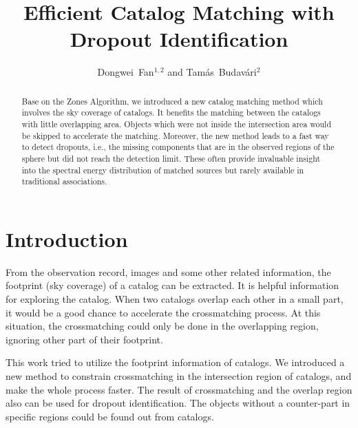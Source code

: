 
\resetcounters



\title{Efficient Catalog Matching with Dropout Identification}
\author{Dongwei~Fan$^{1,2}$ and Tam\'as~Budav\'ari$^2$}


\begin{abstract}
Base on the Zones Algorithm, we introduced a new catalog matching method which involves the sky coverage of catalogs. It benefits the matching between the catalogs with little overlapping area. Objects which were not inside the intersection area would be skipped to accelerate the matching. Moreover, the new method leads to a fast way to detect dropouts, i.e., the missing components that are in the observed regions of the sphere but did not reach the detection limit. These often provide invaluable insight into the spectral energy distribution of matched sources but rarely available in traditional associations.
\end{abstract}

\section{Introduction}
From the observation record, images and some other related information, the footprint (sky coverage) of a catalog can be extracted. It is helpful information for exploring the catalog. When two catalogs overlap each other in a small part, it would be a good chance to accelerate the crossmatching process. At this situation, the crossmatching could only be done in the overlapping region, ignoring other part of their footprint.

This work tried to utilize the footprint information of catalogs. We introduced a new method to constrain crossmatching in the intersection region of catalogs, and make the whole process faster. The result of crossmatching and the overlap region also can be used for dropout identification. The objects without a counter-part in specific regions could be found out from catalogs.


